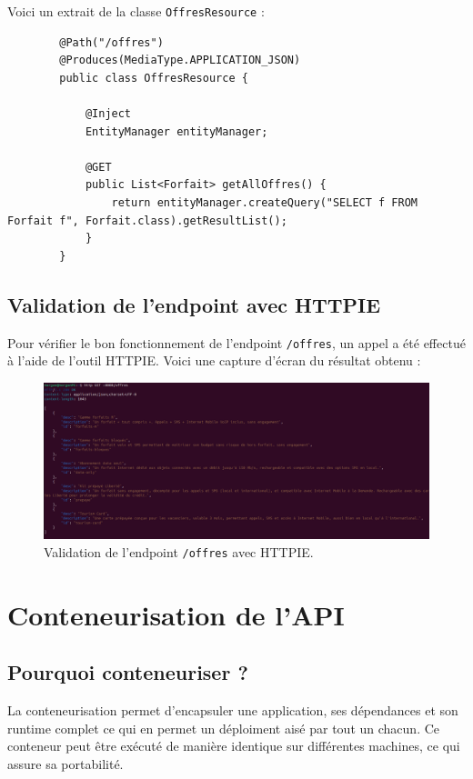 \documentclass{article}
\begin{document}
	Voici un extrait de la classe \texttt{OffresResource} :
	\begin{lstlisting}
		@Path("/offres")
		@Produces(MediaType.APPLICATION_JSON)
		public class OffresResource {
			
			@Inject
			EntityManager entityManager;
			
			@GET
			public List<Forfait> getAllOffres() {
				return entityManager.createQuery("SELECT f FROM Forfait f", Forfait.class).getResultList();
			}
		}
	\end{lstlisting}
	\newpage
	\subsection{Validation de l'endpoint avec HTTPIE}
	
	Pour vérifier le bon fonctionnement de l'endpoint \texttt{/offres}, un appel a été effectué à l'aide de l'outil HTTPIE. Voici une capture d'écran du résultat obtenu :
	
	\begin{figure}[h!]
		\centering
		\includegraphics[width=1\textwidth]{asset/endpoint offres.png}
		\caption{Validation de l'endpoint \texttt{/offres} avec HTTPIE.}
		\label{fig:offres_endpoint}
	\end{figure}
	\section{Conteneurisation de l'API}
	
	\subsection{Pourquoi conteneuriser ?}
	
	La conteneurisation permet d'encapsuler une application, ses dépendances et son runtime complet ce qui en permet un déploiment aisé par tout un chacun. Ce conteneur peut être exécuté de manière identique sur différentes machines, ce qui assure sa portabilité.
	
\end{document}
